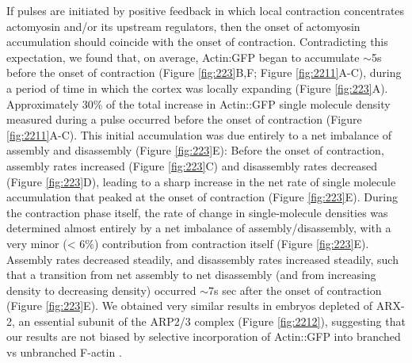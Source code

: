 If pulses are initiated by positive feedback in which local contraction concentrates actomyosin and/or its upstream regulators, then the onset of actomyosin accumulation should coincide with the onset of contraction. Contradicting this expectation, we found that, on average, Actin:GFP began to accumulate $\sim$5s before the onset of contraction (Figure \ref{fig:223}B,F; Figure \ref{fig:2211}A-C), during a period of time in which the cortex was locally expanding (Figure \ref{fig:223}A). Approximately 30$\%$ of the total increase in Actin::GFP single molecule density measured during a pulse occurred before the onset of contraction (Figure \ref{fig:2211}A-C). This initial accumulation was due entirely to a net imbalance of assembly and disassembly (Figure \ref{fig:223}E): Before the onset of contraction, assembly rates increased (Figure \ref{fig:223}C) and disassembly rates decreased (Figure \ref{fig:223}D), leading to a sharp increase in the net rate of single molecule accumulation that peaked at the onset of contraction (Figure \ref{fig:223}E).  During the contraction phase itself, the rate of change in single-molecule densities was determined almost entirely by a net imbalance of assembly/disassembly, with a very minor (< 6$\%$) contribution from contraction itself (Figure \ref{fig:223}E). Assembly rates decreased steadily, and disassembly rates increased steadily, such that a transition from net assembly to net disassembly  (and from increasing density to decreasing density) occurred $\sim$7s sec after the onset of contraction (Figure \ref{fig:223}E).  We obtained very similar results in embryos depleted of ARX-2, an essential subunit of the ARP2/3 complex (Figure \ref{fig:2212}), suggesting that our results are not biased by selective incorporation of Actin::GFP into branched vs unbranched F-actin \cite{Chen:2012dx}.

